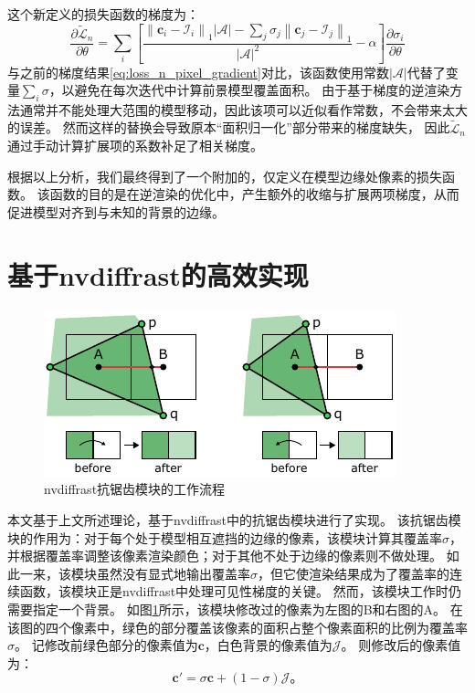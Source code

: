 这个新定义的损失函数的梯度为：
\begin{equation}
\frac{\partial\tilde{\mathcal{L}}_n}{\partial\theta} =
\sum_{i}\left[
    \frac{
        \textstyle \left\| \mathbf{c}_i - \mathcal{I}_i \right\|_1 |\mathcal{A}| -
        \textstyle \sum_j \sigma_j \left\| \mathbf{c}_j - \mathcal{I}_j \right\|_1
    }{|\mathcal{A}|^2} - \alpha
\right]\frac{\partial\sigma_i}{\partial\theta}
\end{equation}
与之前的梯度结果\eqref{eq:loss_n_pixel_gradient}对比，该函数使用常数$|\mathcal{A}|$代替了变量$\sum_{i} \sigma$，以避免在每次迭代中计算前景模型覆盖面积。
由于基于梯度的逆渲染方法通常并不能处理大范围的模型移动，因此该项可以近似看作常数，不会带来太大的误差。
然而这样的替换会导致原本“面积归一化”部分带来的梯度缺失，
因此$\tilde{\mathcal{L}}_n$通过手动计算扩展项的系数补足了相关梯度。

根据以上分析，我们最终得到了一个附加的，仅定义在模型边缘处像素的损失函数。
该函数的目的是在逆渲染的优化中，产生额外的收缩与扩展两项梯度，从而促进模型对齐到与未知的背景的边缘。

\section{基于nvdiffrast的高效实现}
\label{sec:method_nvdiffrast}

\begin{figure}[ht]
    \centering
    \includegraphics{figures/antialias}
    \caption[nvdiffrast抗锯齿模块的工作流程]{nvdiffrast抗锯齿模块的工作流程\citep{nvdiffrast}}
    \label{fig:aa}
\end{figure}
本文基于上文所述理论，基于nvdiffrast\citep{nvdiffrast}中的抗锯齿模块进行了实现。
该抗锯齿模块的作用为：对于每个处于模型相互遮挡的边缘的像素，该模块计算其覆盖率$\sigma$，并根据覆盖率调整该像素渲染颜色；对于其他不处于边缘的像素则不做处理。
如此一来，该模块虽然没有显式地输出覆盖率$\sigma$，但它使渲染结果成为了覆盖率的连续函数，该模块正是nvdiffrast中处理可见性梯度的关键。
然而，该模块工作时仍需要指定一个背景。
如图\ref{fig:aa}所示，该模块修改过的像素为左图的B和右图的A。
在该图的四个像素中，绿色的部分覆盖该像素的面积占整个像素面积的比例为覆盖率$\sigma$。
记修改前绿色部分的像素值为$\mathbf{c}$，白色背景的像素值为$\mathcal{J}$。
则修改后的像素值为：
\begin{equation}
\mathbf{c}' = \sigma\mathbf{c} + (1-\sigma)\mathcal{J}
\text{。}
\end{equation}


